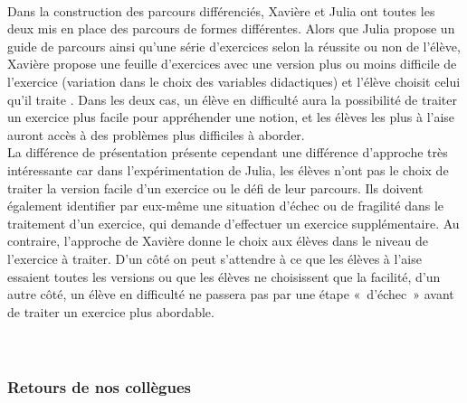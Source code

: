 \paragraph*{}Dans la construction des parcours différenciés, Xavière et Julia ont toutes les deux mis en place des parcours de formes différentes. Alors que Julia propose un guide de parcours ainsi qu'une série d'exercices selon la réussite ou non de l'élève, Xavière propose une feuille d'exercices avec une version plus ou moins difficile de l'exercice (variation dans le choix des variables didactiques) et l'élève choisit celui qu'il traite . Dans les deux cas, un élève en difficulté aura la possibilité de traiter un exercice plus facile pour appréhender une notion, et les élèves les plus à l'aise auront accès à des problèmes plus difficiles à aborder.\\
La différence de présentation présente cependant une différence d'approche très intéressante car dans l'expérimentation de Julia, les élèves n'ont pas le choix de traiter la version facile d'un exercice ou le défi de leur parcours. Ils doivent également identifier par eux-même une situation d'échec ou de fragilité dans le traitement d'un exercice, qui demande d'effectuer un exercice supplémentaire. Au contraire, l'approche de Xavière donne le choix aux élèves dans le niveau de l'exercice à traiter. D'un côté on peut s'attendre à ce que les élèves à l'aise essaient toutes les versions ou que les élèves ne choisissent que la facilité, d'un autre côté, un élève en difficulté ne passera pas par une étape « d'échec » avant de traiter un exercice plus abordable.
\paragraph*{}
\\
\subsubsection{Retours de nos collègues}
